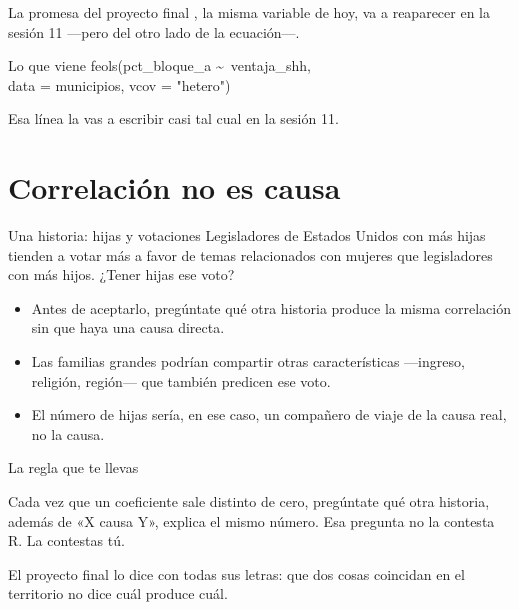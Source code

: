 \begin{frame}{La promesa del proyecto final}
  \vspace{0.2em}
  , la misma variable de hoy, va a reaparecer en la
  sesión 11 —pero del otro lado de la ecuación—.

  \vspace{0.9em}
  \begin{block}{Lo que viene}
    \small\ttfamily feols(pct\_bloque\_a \textasciitilde\ ventaja\_shh,\\
    \hspace{2em}data = municipios, vcov = "hetero")
  \end{block}

  \vspace{0.7em}
  Esa línea la vas a escribir casi tal cual en la sesión 11.
\end{frame}

\section{Correlación no es causa}

\begin{frame}{Una historia: hijas y votaciones}
  \vspace{0.3em}
  Legisladores de Estados Unidos con más hijas tienden a votar más a favor
  de temas relacionados con mujeres que legisladores con más hijos.
  ¿Tener hijas  ese voto?

  \vspace{0.9em}
  \begin{itemize}\setlength{\itemsep}{0.8em}
    \item<1-> Antes de aceptarlo, pregúntate qué otra historia produce la
          misma correlación sin que haya una causa directa.
    \item<2-> Las familias grandes podrían compartir otras características
          —ingreso, religión, región— que también predicen ese voto.
    \item<3-> El número de hijas sería, en ese caso, un compañero de viaje
          de la causa real, no la causa.
  \end{itemize}
\end{frame}

\begin{frame}{La regla que te llevas}
  \vspace{0.6em}
  \begin{saltobox}
    Cada vez que un coeficiente sale distinto de cero, pregúntate qué otra
    historia, además de «X causa Y», explica el mismo número. Esa pregunta
    no la contesta R. La contestas tú.
  \end{saltobox}

  \vspace{1.2em}
  {\small\color{grisTenue}El proyecto final lo dice con todas sus letras:
  que dos cosas coincidan en el territorio no dice cuál produce cuál.}
\end{frame}

